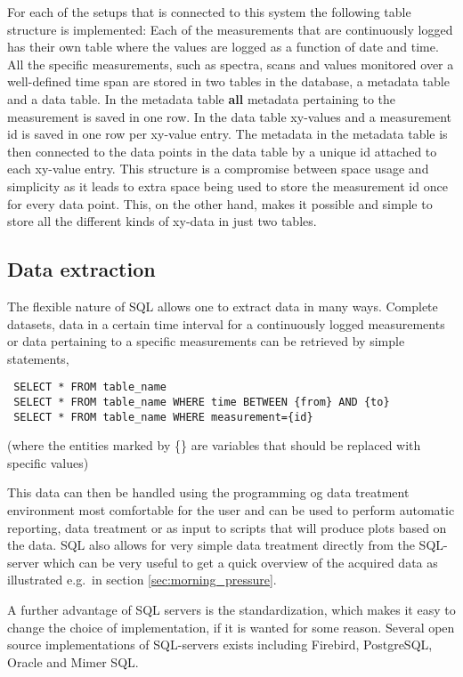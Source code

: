 For each of the setups that is connected to this system the following table
structure is implemented: Each of the measurements that are continuously logged
has their own table where the values are logged as a function of date and
time. All the specific measurements, such as spectra, scans and values
monitored over a well-defined time span are stored in two tables in the
database, a metadata table and a data table. In the metadata table \textbf{all}
metadata pertaining to the measurement is saved in one row. In the data table
xy-values and a measurement id is saved in one row per xy-value entry. The
metadata in the metadata table is then connected to the data points in the data
table by a unique id attached to each xy-value entry. This structure is a
compromise between space usage and simplicity as it leads to extra space being
used to store the measurement id once for every data point. This, on the other
hand, makes it possible and simple to store all the different kinds of xy-data
in just two tables.

\subsection{Data extraction} \label{sec:data_extraction}
The flexible nature of SQL allows one to extract data in many ways. Complete
datasets, data in a certain time interval for a continuously logged
measurements or data pertaining to a specific measurements can be retrieved by
simple statements, 
\begin{verbatim}
 SELECT * FROM table_name
 SELECT * FROM table_name WHERE time BETWEEN {from} AND {to}
 SELECT * FROM table_name WHERE measurement={id}
\end{verbatim}
(where the entities marked by \{\} are variables that should be
replaced with specific values)

This data can then be handled using the programming og data treatment environment most
comfortable for the user and can be used to perform automatic reporting, data
treatment or as input to scripts that will produce plots based on the data. SQL
also allows for very simple data treatment directly from the SQL-server
which can be very useful to get a quick overview of the acquired data as
illustrated e.g.\ in section \ref{sec:morning_pressure}.

A further advantage of SQL servers is the standardization, which makes it easy
to change the choice of implementation, if it is wanted for some reason.
Several open source implementations of SQL-servers exists including Firebird,
PostgreSQL, Oracle and Mimer SQL.
